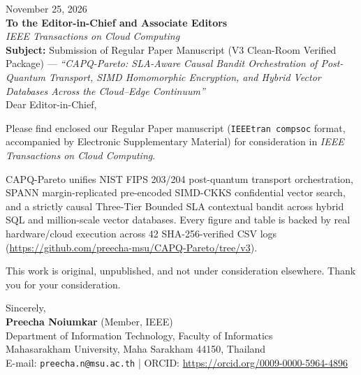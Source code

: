 \documentclass[11pt,a4paper]{article}
\begin{document}
\noindent November 25, 2026\\[1.0em]
\textbf{To the Editor-in-Chief and Associate Editors}\\
\textit{IEEE Transactions on Cloud Computing}\\[1.0em]
\textbf{Subject:} Submission of Regular Paper Manuscript (V3 Clean-Room Verified Package) --- \textit{``CAPQ-Pareto: SLA-Aware Causal Bandit Orchestration of Post-Quantum Transport, SIMD Homomorphic Encryption, and Hybrid Vector Databases Across the Cloud--Edge Continuum''}\\[1.0em]
Dear Editor-in-Chief,

Please find enclosed our Regular Paper manuscript (\texttt{IEEEtran compsoc} format, accompanied by Electronic Supplementary Material) for consideration in \textit{IEEE Transactions on Cloud Computing}.

CAPQ-Pareto unifies NIST FIPS 203/204 post-quantum transport orchestration, SPANN margin-replicated pre-encoded SIMD-CKKS confidential vector search, and a strictly causal Three-Tier Bounded SLA contextual bandit across hybrid SQL and million-scale vector databases. Every figure and table is backed by real hardware/cloud execution across 42 SHA-256-verified CSV logs (\url{https://github.com/preecha-msu/CAPQ-Pareto/tree/v3}).

This work is original, unpublished, and not under consideration elsewhere. Thank you for your consideration.

\vspace{1.5em}
\noindent Sincerely,\\[1.2em]
\textbf{Preecha Noiumkar} (Member, IEEE)\\
Department of Information Technology, Faculty of Informatics\\
Mahasarakham University, Maha Sarakham 44150, Thailand\\
E-mail: \texttt{preecha.n@msu.ac.th} \;|\; ORCID: \url{https://orcid.org/0009-0000-5964-4896}
\end{document}
